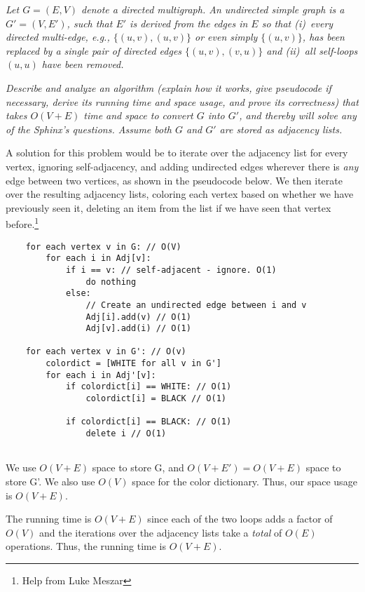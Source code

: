 \documentclass[12pt]{article}
\begin{document}
\begin{enumerate}
	\textit{Let $G=(E,V)$ denote a directed multigraph. An undirected simple graph is a $G'=(V,E')$, such that $E'$ is derived from the edges in $E$ so 
that (i)~every directed multi-edge, e.g., $\{(u,v),(u,v)\}$ or even simply $\{(u,v)\}$, has been replaced by a single pair of directed edges $\{(u,v),(v,u)\}$ 
and (ii)~all self-loops $(u,u)$ have been removed.}


	\textit{Describe and analyze an algorithm (explain how it works, give pseudocode if necessary, derive its running time and space usage, and prove its 
correctness) that takes \mbox{$O(V+E)$} time and space to convert $G$ into $G'$, and thereby will solve any of the Sphinx's questions. Assume both $G$ and 
$G'$ are stored as adjacency lists.}
	
	A solution for this problem would be to iterate over the adjacency list for every vertex, ignoring self-adjacency, and adding undirected edges 
wherever there is \textit{any} edge between two vertices, as shown in the pseudocode below. We then iterate over the resulting adjacency lists, coloring each 
vertex based on whether we have previously seen it, deleting an item from the list if we have seen that vertex before.\footnote{Help from Luke Meszar}
	
	\begin{small}
	\begin{verbatim}
	for each vertex v in G: // O(V)
	    for each i in Adj[v]:
	        if i == v: // self-adjacent - ignore. O(1)
	            do nothing
	        else:
	            // Create an undirected edge between i and v
	            Adj[i].add(v) // O(1)
	            Adj[v].add(i) // O(1)
	        
	for each vertex v in G': // O(v)
	    colordict = [WHITE for all v in G']
	    for each i in Adj'[v]:
	        if colordict[i] == WHITE: // O(1)
	            colordict[i] = BLACK // O(1)
	        
	        if colordict[i] == BLACK: // O(1)
	            delete i // O(1)
	        
	\end{verbatim}
	\end{small}
	
	We use $O(V + E)$ space to store G, and $O(V + E') = O(V + E)$ space to store G'. We also use $O(V)$ space for the color dictionary. Thus, our space 
usage is $O(V + E)$.
	
	The running time is $O(V + E)$ since each of the two loops adds a factor of $O(V)$ and the iterations over the adjacency lists take a \textit{total} 
of $O(E)$ operations. Thus, the running time is $O(V + E)$.
	

\end{enumerate}
\end{document}

